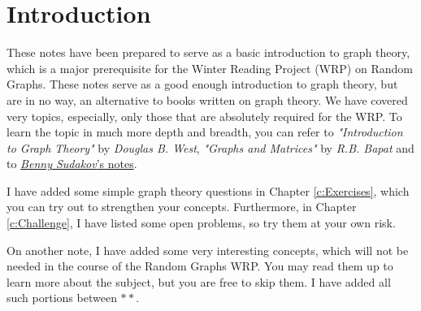 \chapter{Introduction}
\label{c:introduction}
These notes have been prepared to serve as a basic introduction to graph theory, which is a major prerequisite for the Winter Reading Project (WRP) on Random Graphs. These notes serve as a good enough introduction to graph theory, but are in no way, an alternative to books written on graph theory. We have covered very topics, especially, only those that are absolutely required for the WRP. To learn the topic in much more depth and breadth, you can refer to \textit{"Introduction to Graph Theory"} by \textit{Douglas B. West}, \textit{"Graphs and Matrices"} by \textit{R.B. Bapat} and to \href{https://www2.math.ethz.ch/education/bachelor/lectures/fs2016/math/graph_theory/graph_theory_notes.pdf}{\textit{Benny Sudakov}'s notes}. 

I have added some simple graph theory questions in Chapter \ref{c:Exercises}, which you can try out to strengthen your concepts. Furthermore, in Chapter \ref{c:Challenge}, I have listed some open problems, so try them at your own risk.

On another note, I have added some very interesting concepts, which will not be needed in the course of the Random Graphs WRP. You may read them up to learn more about the subject, but you are free to skip them. I have added all such portions between $**$.